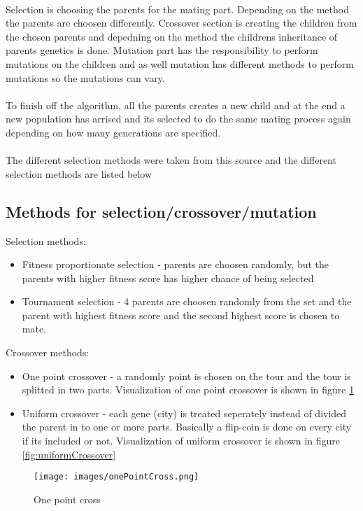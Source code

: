 \documentclass[12pt]{report}
\begin{document}
    \\
    Selection is choosing the parents for the mating part. Depending on the method the parents are choosen differently. Crossover section is creating the children from the chosen parents and depedning on the method the childrens inheritance of parents genetics is done. Mutation part has the responsibility to perform mutations on the children and as well mutation has different methods to perform mutations so the mutations can vary.\\
    \\
    To finish off the algorithm, all the parents creates a new child and at the end a new population has arrised and its selected to do the same mating process again depending on how many generations are specified.\\
    \\
    The different selection methods were taken from this source \cite{Elitismsource} and the different selection methods are listed below 
    \subsection{Methods for selection/crossover/mutation}
    Selection methods: \cite{Elitismsource}
    \begin{itemize}
        \item Fitness proportionate selection - parents are choosen randomly, but the parents with higher fitness score has higher chance of being selected
        \item Tournament selection - 4 parents are choosen randomly from the set and the parent with highest fitness score and the second highest score is chosen to mate.
    \end{itemize}
    Crossover methods: \cite{CrossoverSource} 
    \begin{itemize}
        \item One point crossover - a randomly point is chosen on the tour and the tour is splitted in two parts. Visualization of one point crossover is shown in figure \ref{fig:OnePointCross}
        \item Uniform crossover - each gene (city) is treated seperately instead of divided the parent in to one or more parts. Basically a flip-coin is done on every city if its included or not. Visualization of uniform crossover is shown in figure \ref{fig:uniformCrossover}
    \end{itemize}
    
    \begin{figure}
        \centering
        \texttt{[image: images/onePointCross.png]}
        \caption{One point cross}
        \label{fig:OnePointCross}
    \end{figure}
\end{document}
